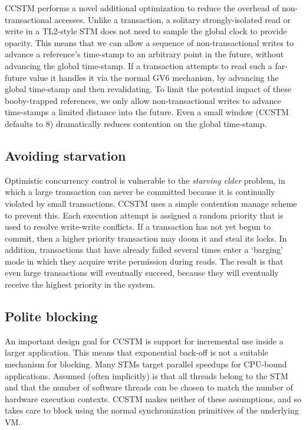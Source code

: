 CCSTM performs a novel additional optimization to reduce the overhead
of non-transactional accesses.  Unlike a transaction, a solitary
strongly-isolated read or write in a TL2-style STM does not need to
sample the global clock to provide opacity.  This means that we can allow
a sequence of non-transactional writes to advance a reference's time-stamp to
an arbitrary point in the future, without advancing the global time-stamp.
If a transaction attempts to read such a far-future value it handles
it via the normal GV6 mechanism, by advancing the global time-stamp and
then revalidating.  To limit the potential impact of these booby-trapped
references, we only allow non-transactional writes to advance time-stamps
a limited distance into the future.  Even a small window (CCSTM defaults
to 8) dramatically reduces contention on the global time-stamp.

\subsection{Avoiding starvation}

Optimistic concurrency control is vulnerable to the \textit{starving
elder} problem, in which a large transaction can never be committed because
it is continually violated by small transactions.  CCSTM uses a simple
contention manage scheme to prevent this.  Each execution attempt is
assigned a random priority that is used to resolve write-write conflicts.
If a transaction has not yet begun to commit, then a higher priority
transaction may doom it and steal its locks.  In addition, transactions
that have already failed several times enter a `barging' mode in which
they acquire write permission during reads.  The result is that even
large transactions will eventually succeed, because they will eventually
receive the highest priority in the system.

\subsection{Polite blocking}

An important design goal for CCSTM is support for incremental use inside
a larger application.  This means that exponential back-off is not a
suitable mechanism for blocking.  Many STMs target parallel speedups
for CPU-bound applications.  Assumed (often implicitly) is that all
threads belong to the STM and that the number of software threads can be
chosen to match the number of hardware execution contexts.  CCSTM makes
neither of these assumptions, and so takes care to block using the normal
synchronization primitives of the underlying VM.

